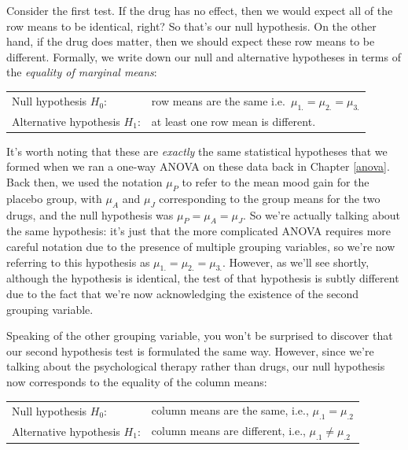 \documentclass[
]{book}
\theoremstyle{definition}
\theoremstyle{definition}
\theoremstyle{definition}
\theoremstyle{definition}
\theoremstyle{remark}
\begin{document}
Consider the first test. If the drug has no effect, then we would expect all of the row means to be identical, right? So that's our null hypothesis. On the other hand, if the drug does matter, then we should expect these row means to be different. Formally, we write down our null and alternative hypotheses in terms of the \emph{equality of marginal means}:

\begin{longtable}[]{@{}
  >{\raggedright\arraybackslash}p{}
  >{\raggedright\arraybackslash}p{}@{}}
\toprule()
\endhead
Null hypothesis \(H_0\): & row means are the same i.e.~\(\mu_{1.} = \mu_{2.} = \mu_{3.}\) \\
Alternative hypothesis \(H_1\): & at least one row mean is different. \\
\bottomrule()
\end{longtable}

It's worth noting that these are \emph{exactly} the same statistical hypotheses that we formed when we ran a one-way ANOVA on these data back in Chapter \ref{anova}. Back then, we used the notation \(\mu_P\) to refer to the mean mood gain for the placebo group, with \(\mu_A\) and \(\mu_J\) corresponding to the group means for the two drugs, and the null hypothesis was \(\mu_P = \mu_A = \mu_J\). So we're actually talking about the same hypothesis: it's just that the more complicated ANOVA requires more careful notation due to the presence of multiple grouping variables, so we're now referring to this hypothesis as \(\mu_{1.} = \mu_{2.} = \mu_{3.}\). However, as we'll see shortly, although the hypothesis is identical, the test of that hypothesis is subtly different due to the fact that we're now acknowledging the existence of the second grouping variable.

Speaking of the other grouping variable, you won't be surprised to discover that our second hypothesis test is formulated the same way. However, since we're talking about the psychological therapy rather than drugs, our null hypothesis now corresponds to the equality of the column means:

\begin{longtable}[]{@{}
  >{\raggedright\arraybackslash}p{}
  >{\raggedright\arraybackslash}p{}@{}}
\toprule()
\endhead
Null hypothesis \(H_0\): & column means are the same, i.e., \(\mu_{.1} = \mu_{.2}\) \\
Alternative hypothesis \(H_1\): & column means are different, i.e., \(\mu_{.1} \neq \mu_{.2}\) \\
\bottomrule()
\end{longtable}
\end{document}
